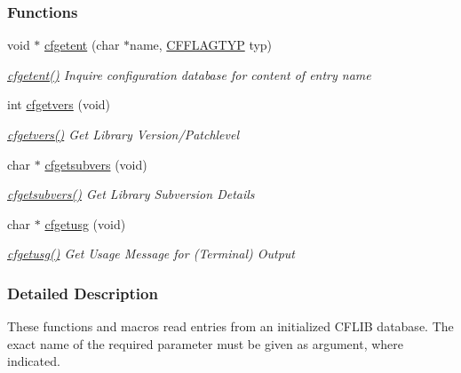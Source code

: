 \subsubsection*{Functions}
\begin{DoxyCompactItemize}
\item 
void $\ast$ \hyperlink{group__retrieval_gac13ba743ed26e6c05df14817ad9df3da}{cfgetent} (char $\ast$name, \hyperlink{group__special__options__mask_ga4854f1596d5c6e0604a478fa9a2e23f0}{C\-F\-F\-L\-A\-G\-T\-Y\-P} typ)
\begin{DoxyCompactList}\small\item\em \hyperlink{group__retrieval_gac13ba743ed26e6c05df14817ad9df3da}{cfgetent()} Inquire configuration database for content of entry name \end{DoxyCompactList}\item 
int \hyperlink{group__retrieval_gac4e376e3630e9b25655ee0e0b1a54a5b}{cfgetvers} (void)
\begin{DoxyCompactList}\small\item\em \hyperlink{group__retrieval_gac4e376e3630e9b25655ee0e0b1a54a5b}{cfgetvers()} Get Library Version/\-Patchlevel \end{DoxyCompactList}\item 
char $\ast$ \hyperlink{group__retrieval_ga160032675def60398ebfd66589ddc1e5}{cfgetsubvers} (void)
\begin{DoxyCompactList}\small\item\em \hyperlink{group__retrieval_ga160032675def60398ebfd66589ddc1e5}{cfgetsubvers()} Get Library Subversion Details \end{DoxyCompactList}\item 
char $\ast$ \hyperlink{group__retrieval_gad3e4e24668cdc111471332a7e79fc897}{cfgetusg} (void)
\begin{DoxyCompactList}\small\item\em \hyperlink{group__retrieval_gad3e4e24668cdc111471332a7e79fc897}{cfgetusg()} Get Usage Message for (Terminal) Output \end{DoxyCompactList}\end{DoxyCompactItemize}


\subsubsection{Detailed Description}
These functions and macros read entries from an initialized C\-F\-L\-I\-B database. The exact name of the required parameter must be given as argument, where indicated. 


